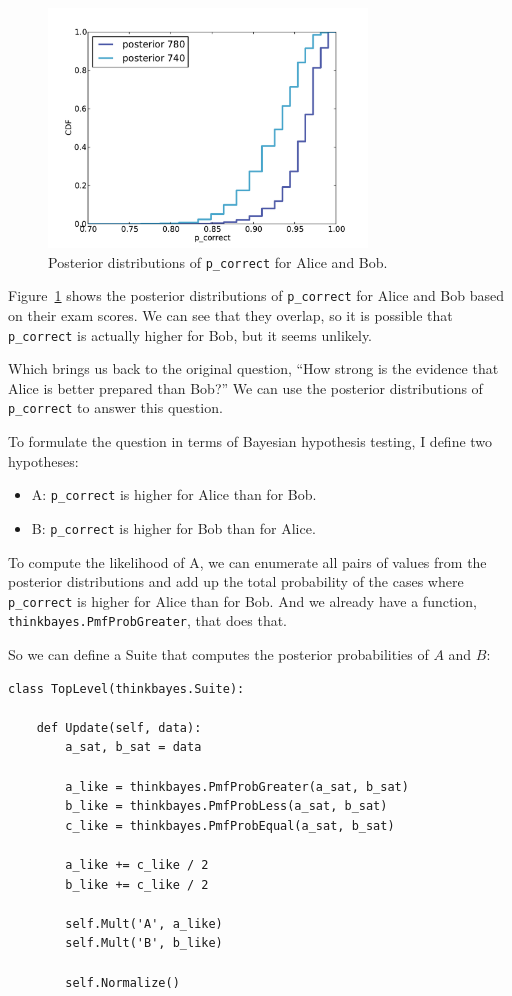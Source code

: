 \documentclass[12pt]{book}
\begin{document}
\begin{figure}
\centerline{\includegraphics[height=2.5in]{figs/sat_posteriors_p_corr.pdf}}
\caption{Posterior distributions of {\tt p\_correct} for Alice and Bob.}
\label{fig.satposterior1}
\end{figure}

Figure~\ref{fig.satposterior1} shows the posterior distributions
of \verb"p_correct" for Alice and Bob based on their exam scores.
We can see that they overlap, so it is possible that \verb"p_correct"
is actually higher for Bob, but it seems unlikely.

Which brings us back to the original question, ``How strong is the
evidence that Alice is better prepared than Bob?''  We can use the
posterior distributions of \verb"p_correct" to answer this question.

To formulate the question in terms of Bayesian hypothesis testing,
I define two hypotheses:

\begin{itemize}

\item A: \verb"p_correct" is higher for Alice than for Bob.

\item B: \verb"p_correct" is higher for Bob than for Alice.

\end{itemize}

To compute the likelihood of A, we can enumerate all pairs of values
from the posterior distributions and add up the total probability of
the cases where \verb"p_correct" is higher for Alice than for Bob.
And we already have a function, \verb"thinkbayes.PmfProbGreater",
that does that.

So we can define a Suite that computes the posterior probabilities
of $A$ and $B$:

\begin{verbatim}
class TopLevel(thinkbayes.Suite):

    def Update(self, data):
        a_sat, b_sat = data

        a_like = thinkbayes.PmfProbGreater(a_sat, b_sat)
        b_like = thinkbayes.PmfProbLess(a_sat, b_sat)
        c_like = thinkbayes.PmfProbEqual(a_sat, b_sat)

        a_like += c_like / 2
        b_like += c_like / 2

        self.Mult('A', a_like)
        self.Mult('B', b_like)

        self.Normalize()
\end{verbatim}
\end{document}

